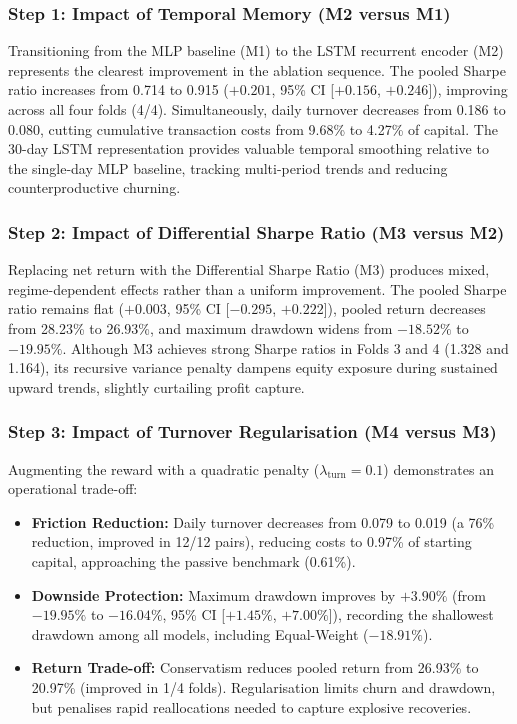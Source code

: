 \documentclass[11pt,a4paper]{article}
\numberwithin{equation}{section}
\numberwithin{table}{section}
\numberwithin{figure}{section}
\numberwithin{algorithm}{section}
\begin{document}
\subsubsection{Step 1: Impact of Temporal Memory (M2 versus M1)}
Transitioning from the MLP baseline (M1) to the LSTM recurrent encoder (M2) represents the clearest improvement in the ablation sequence. The pooled Sharpe ratio increases from 0.714 to 0.915 ($+0.201$, 95\% CI [$+0.156$, $+0.246$]), improving across all four folds (4/4). Simultaneously, daily turnover decreases from 0.186 to 0.080, cutting cumulative transaction costs from 9.68\% to 4.27\% of capital. The 30-day LSTM representation provides valuable temporal smoothing relative to the single-day MLP baseline, tracking multi-period trends and reducing counterproductive churning.

\subsubsection{Step 2: Impact of Differential Sharpe Ratio (M3 versus M2)}
Replacing net return with the Differential Sharpe Ratio (M3) produces mixed, regime-dependent effects rather than a uniform improvement. The pooled Sharpe ratio remains flat ($+0.003$, 95\% CI [$-0.295$, $+0.222$]), pooled return decreases from 28.23\% to 26.93\%, and maximum drawdown widens from $-18.52\%$ to $-19.95\%$. Although M3 achieves strong Sharpe ratios in Folds 3 and 4 (1.328 and 1.164), its recursive variance penalty dampens equity exposure during sustained upward trends, slightly curtailing profit capture.

\subsubsection{Step 3: Impact of Turnover Regularisation (M4 versus M3)}
Augmenting the reward with a quadratic penalty ($\lambda_{\mathrm{turn}}=0.1$) demonstrates an operational trade-off:
\begin{itemize}
\item \textbf{Friction Reduction:} Daily turnover decreases from 0.079 to 0.019 (a 76\% reduction, improved in 12/12 pairs), reducing costs to 0.97\% of starting capital, approaching the passive benchmark (0.61\%).
\item \textbf{Downside Protection:} Maximum drawdown improves by $+3.90\%$ (from $-19.95\%$ to $-16.04\%$, 95\% CI [$+1.45\%$, $+7.00\%$]), recording the shallowest drawdown among all models, including Equal-Weight ($-18.91\%$).
\item \textbf{Return Trade-off:} Conservatism reduces pooled return from 26.93\% to 20.97\% (improved in 1/4 folds). Regularisation limits churn and drawdown, but penalises rapid reallocations needed to capture explosive recoveries.
\end{itemize}
\end{document}
